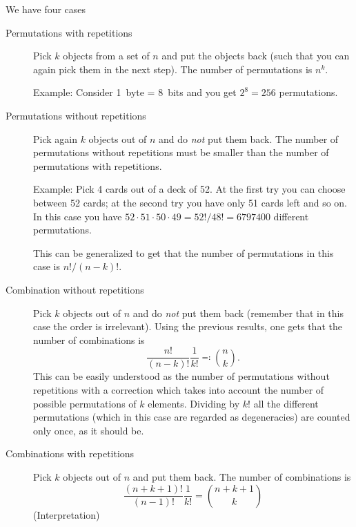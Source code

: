 We have four cases
\begin{description}
	\item[Permutations with repetitions]
		Pick $k$ objects from a set of $n$ and put the objects back (such that you can again pick them in the next step).
		The number of permutations is $n^k$.

		Example: Consider \SI{1}{byte} = \SI{8}{bits} and you get $2^8 = 256$ permutations.

	\item[Permutations without repetitions]


		Pick again $k$ objects out of $n$ and do \emph{not} put them back.
		The number of permutations without repetitions must be smaller than the number of permutations with repetitions.

		Example: Pick \num{4} cards out of a deck of \num{52}.
		At the first try you can choose between \num{52} cards; at the second try you have only \num{51} cards left and so on.
		In this case you have $52\cdot51\cdot50\cdot49 = 52!/48! = \num{6797400}$ different permutations.

		This can be generalized to get that the number of permutations in this case is $n!/(n-k)!$.

	\item[Combination without repetitions]

		Pick $k$ objects out of $n$ and do \emph{not} put them back (remember that in this case the order is irrelevant).
		Using the previous results, one gets that the number of combinations is
		\begin{equation}
			\frac{n!}{(n-k)!}\frac{1}{k!} \eqqcolon {n \choose k }.
		\end{equation}
		This can be easily understood as the number of permutations without repetitions with a correction which takes into account the number of possible permutations of $k$ elements.
		Dividing by $k!$ all the different permutations (which in this case are regarded as degeneracies) are counted only once, as it should be.

	\item[Combinations with repetitions]

		Pick $k$ objects out of $n$ and put them back.
		The number of combinations is
		\begin{equation}
			\frac{(n+k+1)!}{(n-1)!}\frac{1}{k!} ={ n + k + 1 \choose k}
		\end{equation}
		(Interpretation)
\end{description}

